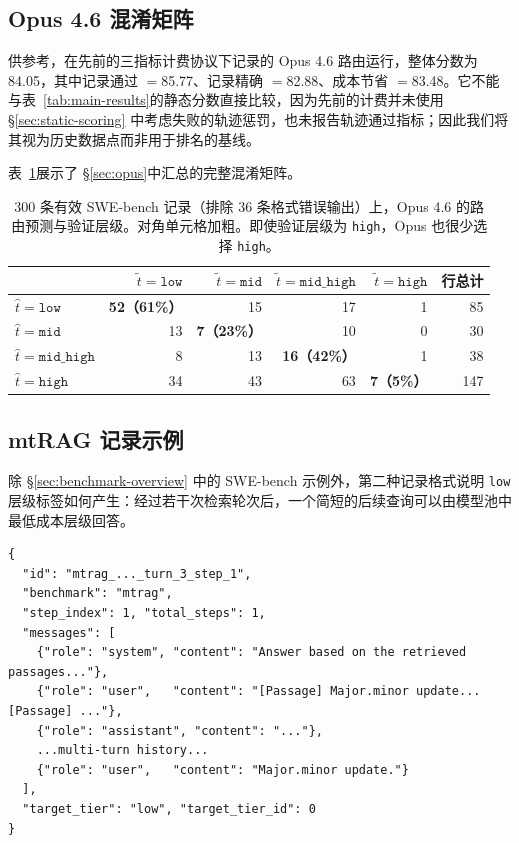 \subsection{Opus 4.6 混淆矩阵}
\label{app:opus-confusion}

供参考，在先前的三指标计费协议下记录的 Opus 4.6 路由运行，整体分数为 84.05，其中记录通过 $=$85.77、记录精确 $=$82.88、成本节省 $=$83.48。它不能与表~\ref{tab:main-results}的静态分数直接比较，因为先前的计费并未使用 \S\ref{sec:static-scoring} 中考虑失败的轨迹惩罚，也未报告轨迹通过指标；因此我们将其视为历史数据点而非用于排名的基线。

表~\ref{tab:opus-confusion}展示了 \S\ref{sec:opus}中汇总的完整混淆矩阵。

\begin{table}[ht]
\centering
\small
\caption{300 条有效 SWE-bench 记录（排除 36 条格式错误输出）上，Opus 4.6 的路由预测与验证层级。对角单元格加粗。即使验证层级为 \texttt{high}，Opus 也很少选择 \texttt{high}。}
\label{tab:opus-confusion}
\begin{tabular}{lrrrrr}
\toprule
 & $\tilde{t}=\texttt{low}$ & $\tilde{t}=\texttt{mid}$ & $\tilde{t}=\texttt{mid\_high}$ & $\tilde{t}=\texttt{high}$ & 行总计 \\
\midrule
$\hat{t}=\texttt{low}$       & \textbf{52（61\%）} & 15 & 17 & 1 & 85 \\
$\hat{t}=\texttt{mid}$       & 13 & \textbf{7（23\%）} & 10 & 0 & 30 \\
$\hat{t}=\texttt{mid\_high}$ & 8  & 13 & \textbf{16（42\%）} & 1 & 38 \\
$\hat{t}=\texttt{high}$      & 34 & 43 & 63 & \textbf{7（5\%）} & 147 \\
\bottomrule
\end{tabular}
\end{table}

\subsection{mtRAG 记录示例}
\label{app:mtrag-example}

除 \S\ref{sec:benchmark-overview} 中的 SWE-bench 示例外，第二种记录格式说明 \texttt{low} 层级标签如何产生：经过若干次检索轮次后，一个简短的后续查询可以由模型池中最低成本层级回答。

\begin{center}
\begin{minipage}{0.95\linewidth}
\scriptsize
\begin{verbatim}
{
  "id": "mtrag_..._turn_3_step_1",
  "benchmark": "mtrag",
  "step_index": 1, "total_steps": 1,
  "messages": [
    {"role": "system", "content": "Answer based on the retrieved passages..."},
    {"role": "user",   "content": "[Passage] Major.minor update... [Passage] ..."},
    {"role": "assistant", "content": "..."},
    ...multi-turn history...
    {"role": "user",   "content": "Major.minor update."}
  ],
  "target_tier": "low", "target_tier_id": 0
}
\end{verbatim}
\end{minipage}
\end{center}

